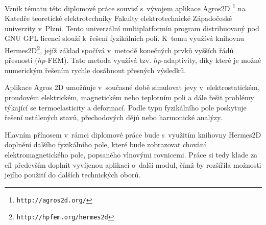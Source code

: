 Vznik tématu této diplomové práce souvisí s~vývojem aplikace Agros2D \footnote{\texttt{http://agros2d.org/}} na Katedře teoretické elektrotechniky Fakulty elektrotechnické Západočeské univerzity v~Plzni. Tento univerzální multiplatformín program distribuovaný pod GNU GPL licencí slouží k~řešení fyzikálních polí. K~tomu využívá knihovnu Hermes2D\footnote{\texttt{http://hpfem.org/hermes2d}}, jejíž základ spočívá v~metodě konečných prvků vyšších řádů přesnosti ($hp$-FEM). Tato metoda využívá tzv. $hp$-adaptivity, díky které je možné numerickým řešením rychle dosáhnout přesných výsledků.  

Aplikace Agros 2D umožňuje v~současné době simulovat jevy v~elektrostatickém, proudovém elektrickém, magnetickém nebo teplotním poli a dále řešit problémy týkající se termoelasticity a deformací. Podle typu fyzikálního pole poskytuje řešení ustálených stavů, přechodových dějů nebo harmonické analýzy.  

Hlavním přínosem v~rámci diplomové práce bude s~využitím knihovny Hermes2D doplnění dalšího fyzikálního pole, které bude zobrazovat chování elektromagnetického pole, popsaného vlnovými rovnicemi. Práce si tedy klade za cíl především doplnit vyvíjenou aplikaci o~další modul, čímž by rozšířila možnosti jejího použití do dalších technických oborů. 
